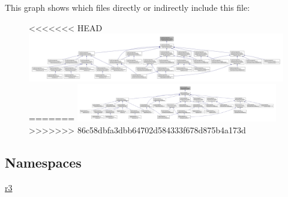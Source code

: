 This graph shows which files directly or indirectly include this file\+:\nopagebreak
\begin{figure}[H]
\begin{center}
\leavevmode
<<<<<<< HEAD
\includegraphics[width=350pt]{_fixed_size_container_8inl__dep__incl}
=======
\includegraphics[width=248pt]{_fixed_size_container_8inl__dep__incl}
>>>>>>> 86c58dbfa3dbb64702d584333f678d875b4a173d
\end{center}
\end{figure}
\subsection*{Namespaces}
\begin{DoxyCompactItemize}
\item 
 \mbox{\hyperlink{namespacer3}{r3}}
\end{DoxyCompactItemize}
